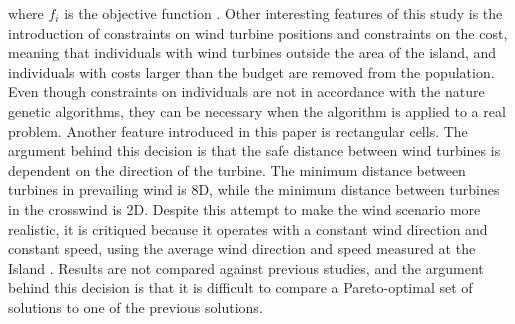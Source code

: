 \noindent where $f_i$ is the objective function \citep{Murata}. Other interesting features of this study is the introduction of constraints on wind turbine positions and constraints on the cost, meaning that individuals with wind turbines outside the area of the island, and individuals with costs larger than the budget are removed from the population. Even though constraints on individuals are not in accordance with the nature genetic algorithms, they can be necessary when the algorithm is applied to a real problem. Another feature introduced in this paper is rectangular cells. The argument behind this decision is that the safe distance between wind turbines is dependent on the direction of the turbine. The minimum distance between turbines in prevailing wind is 8D, while the minimum distance between turbines in the crosswind is 2D. Despite this attempt to make the wind scenario more realistic, it is critiqued because it operates with a constant wind direction and constant speed, using the average wind direction and speed measured at the Island \citep{Samorani}. Results are not compared against previous studies, and the argument behind this decision is that it is difficult to compare a Pareto-optimal set of solutions to one of the previous solutions. \\


